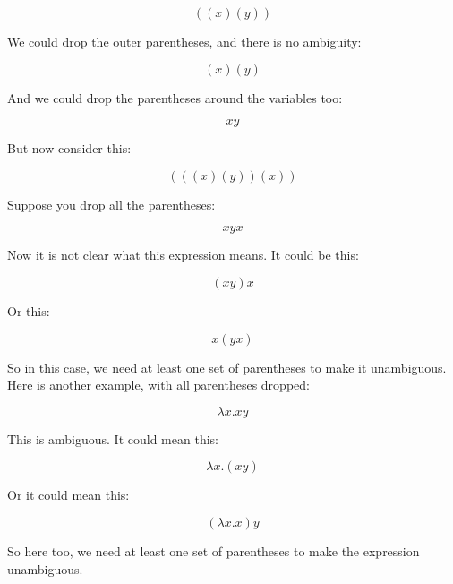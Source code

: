 \documentclass{book}
\numberwithin{equation}{chapter}
\begin{document}
\begin{equation}
((x) (y))
\end{equation}

\noindent
We could drop the outer parentheses, and there is no ambiguity:

\begin{equation}
(x) (y)
\end{equation}

\noindent
And we could drop the parentheses around the variables too:

\begin{equation}
x y
\end{equation}

\noindent
But now consider this:

\begin{equation}
(((x) (y)) (x))
\end{equation}

\noindent
Suppose you drop all the parentheses:

\begin{equation}
x y x
\end{equation}

\noindent
Now it is not clear what this expression means. It could be this:

\begin{equation}
(x y) x
\end{equation}

\noindent
Or this:

\begin{equation}
x (y x)
\end{equation}

\noindent
So in this case, we need at least one set of parentheses to make it unambiguous. Here is another example, with all parentheses dropped:

\begin{equation}
\lambda x.x y
\end{equation}

\noindent
This is ambiguous. It could mean this:

\begin{equation}
\lambda x.(x y)
\end{equation}

\noindent
Or it could mean this:

\begin{equation}
(\lambda x.x) y
\end{equation}

\noindent
So here too, we need at least one set of parentheses to make the expression unambiguous.
\end{document}
